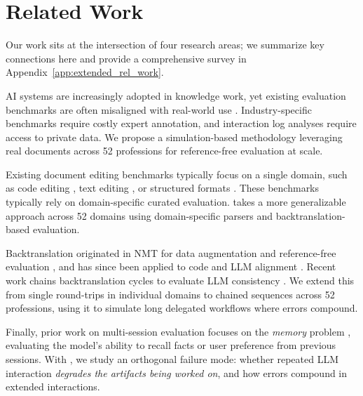 \documentclass{article} %
\begin{document}
\section{Related Work} \label{sec:rel_work}

Our work sits at the intersection of four research areas; we summarize key connections here and provide a comprehensive survey in Appendix~\ref{app:extended_rel_work}.

AI systems are increasingly adopted in knowledge work, yet existing evaluation benchmarks are often misaligned with real-world use \citep{Wang2026HowWD}. Industry-specific benchmarks \citep{Huang2024CRMArenaUT,Drouin2024WorkArenaHC,Xu2024TheAgentCompanyBL,Jha2025ITBenchEA,Chen2025xbenchTA,Mazeika2025RemoteLI} require costly expert annotation, and interaction log analyses \citep{Chatterji2025HowPU,Handa2025WhichET,Tomlinson2025WorkingWA} require access to private data. We propose a simulation-based methodology leveraging real documents across 52 professions for reference-free evaluation at scale.

Existing document editing benchmarks typically focus on a single domain, such as code editing \citep{Cassano2023CanIE,Jimenez2023SWEbenchCL}, text editing \citep{Spangher2022NewsEditsAN,Laban2023SWiPEAD,Raheja2023CoEdITTE}, or structured formats \citep{Nishina2024SVGEditBenchAB,Kapadnis2026ChartEditBenchEG,Ofengenden2025PPTArenaAB}. These benchmarks typically rely on domain-specific curated evaluation. \benchmark{} takes a more generalizable approach across 52 domains using domain-specific parsers and backtranslation-based evaluation.

Backtranslation originated in NMT for data augmentation \citep{Sennrich2015ImprovingNM,Lample2017UnsupervisedMT} and reference-free evaluation \citep{Somers2005RoundtripTW,Zhuo2022RethinkingRT}, and has since been applied to code \citep{Lachaux2020UnsupervisedTO} and LLM alignment \citep{Li2023SelfAlignmentWI}. Recent work chains backtranslation cycles to evaluate LLM consistency \citep{Hong2025ConsistencyCheckerTE,Allamanis2024UnsupervisedEO,Maveli2026CanLC}. We extend this from single round-trips in individual domains to chained sequences across 52 professions, using it to simulate long delegated workflows where errors compound.

Finally, prior work on multi-session evaluation focuses on the \textit{memory} problem \citep{Xu2021BeyondGM,Maharana2024EvaluatingVL,Wu2024LongMemEvalBC}, evaluating the model's ability to recall facts or user preference from previous sessions. With \benchmark{}, we study an orthogonal failure mode: whether repeated LLM interaction \textit{degrades the artifacts being worked on}, and how errors compound in extended interactions.
\end{document}
